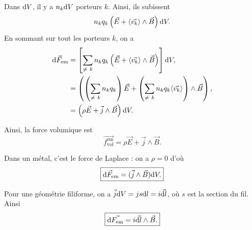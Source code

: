         Dans $\mathrm{d} V$, il y a $n_k\mathrm{d} V$ porteurs $k$. Ainsi, ils subissent
        \begin{equation*}
            n_k q_k\left(\vec{E}+\langle \vec{v_k}\rangle\wedge \vec{B}\right)\mathrm{d} V.
        \end{equation*}
        En sommant sur tout les porteurs $k$, on a 
        \begin{align*}
            \mathrm{d}\vec{F}_{\text{em}}
            &=
            \left[
                \sum_{\neq~k}n_kq_k\left(\vec{E}+\langle\vec{v_k}\rangle\wedge\vec{B}\right)
            \right]\mathrm{d} V,\\
            &=
            \left(
                \left(\sum_{\neq~k}n_k q_k\right)\vec{E}+\left(\sum_{\neq~k}n_kq_k\langle\vec{v_k}\rangle\right)\wedge\vec{B}
            \right),\\
            &=
            \left(\rho\vec{E}+\vec{j}\wedge\vec{B}\right)\mathrm{d} V.
        \end{align*}

        Ainsi, la force volumique est 
        \begin{equation*}
            \boxed{
                \vec{f_{\text{vol}}^{\text{em}}}=\rho\vec{E}+\vec{j}\wedge\vec{B}.
            }
        \end{equation*}

        \begin{example}
            Dans un métal, c'est le force de Laplace : on a $\rho=0$ d'où 
            \begin{equation*}
                \boxed{
                    \mathrm{d}\vec{F}_{\text{em}}=(\vec{j}\wedge\vec{B})\mathrm{d} V.
                }
            \end{equation*}

            Pour une géométrie filiforme, on a $\vec{j}\mathrm{d} V=js\mathrm{d} l=i\vec{\mathrm{d} l}$, où $s$ est la section du fil. Ainsi
            \begin{equation*}
                \boxed{
                    \mathrm{d}\vec{F_{\text{em}}}=i\vec{\mathrm{d} l}\wedge\vec{B}.
                }
            \end{equation*}
        \end{example}